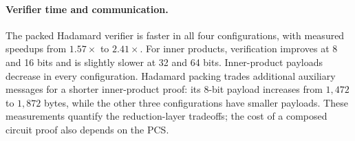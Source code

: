 \paragraph{Verifier time and communication.}
The packed Hadamard verifier is faster in all four configurations,
with measured speedups from \(1.57\times\) to \(2.41\times\).
For inner products, verification improves at 8 and 16 bits and is
slightly slower at 32 and 64 bits.
Inner-product payloads decrease in every configuration.
Hadamard packing trades additional auxiliary messages for a shorter
inner-product proof: its 8-bit payload increases from \(1{,}472\)
to \(1{,}872\) bytes, while the other three configurations have
smaller payloads.
These measurements quantify the reduction-layer tradeoffs;
the cost of a composed circuit proof also depends on the PCS.




